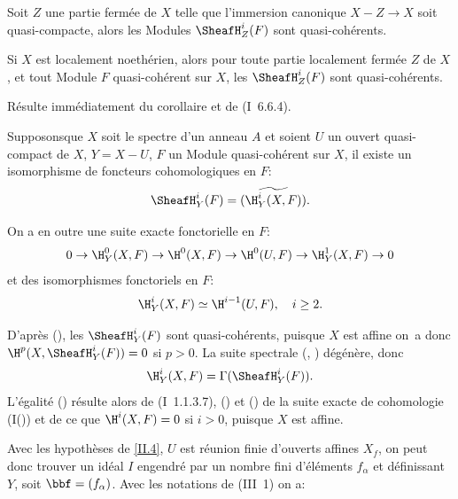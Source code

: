 \begin{supcorollaire} \label{II.2}
Soit $Z$ une partie ferm\'ee de $X$ telle que l'immersion canonique \hbox{$X-Z\to X$} soit quasi-compacte, alors les Modules ${\SheafH}_Z^i(F)$ sont quasi-coh\'erents.
\end{supcorollaire}

\begin{supcorollaire} \label{II.3}
Si $X$ est localement noeth\'erien, alors pour toute partie localement ferm\'ee $Z$ de $X$, et tout Module $F$ quasi-coh\'erent sur $X$, les ${\SheafH}_Z^i(F)$ sont quasi-coh\'erents.
\end{supcorollaire}

R\'esulte imm\'ediatement du corollaire  et de (\EGA I~6.6.4).

\begin{supcorollaire} \label{II.4}
Supposons\pageoriginaled que $X$ soit le spectre d'un anneau $A$ et soient $U$ un ouvert quasi-compact de $X$, $Y=X-U$, $F$ un Module quasi-coh\'erent sur $X$, il existe un isomorphisme de foncteurs cohomologiques en $F$:
\begin{equation} \label{eq:II.4.1} {\SheafH}_Y^i(F) = \widetilde{(\H_Y^i(X, F))}.
\end{equation}

On a en outre une suite exacte fonctorielle en $F$:
\begin{equation} \label{eq:II.4.2}
0 \to \H_Y^0(X, F) \to \H^0(X, F) \to \H^0(U, F) \to \H_Y^1(X, F) \to 0
\end{equation}
et des isomorphismes fonctoriels en $F$:
\begin{equation} \label{eq:II.4.3}
\H_Y^i(X, F) \simeq \H^{i-1}(U, F), \quad i\geq 2.
\end{equation}
\end{supcorollaire}

D'apr\`es (), les ${\SheafH}_Y^i(F)$ sont quasi-coh\'erents, puisque $X$ est affine on~a donc $\H^p(X, {\SheafH}_Y^i(F))=0$ si $p>0$. La suite spectrale (, ) d\'eg\'en\`ere, donc
$$
\H_Y^i(X, F) = \Gamma({\SheafH}_Y^i(F)).
$$
L'\'egalit\'e () r\'esulte alors de (\EGA I~1.1.3.7), () et () de la suite exacte de cohomologie (I()) et de ce que $\H^i(X, F)=0$ si $i>0$, puisque $X$ est affine.

Avec les hypoth\`eses de \eqref{II.4}, $U$ est r\'eunion finie d'ouverts affines $X_f$, on peut donc trouver un id\'eal $I$ engendr\'e par un nombre fini d'\'el\'ements $f_{\alpha}$ et d\'efinissant~$Y$, soit $\bbf=(f_{\alpha})$. Avec les notations de (\EGA III~1) on a:

